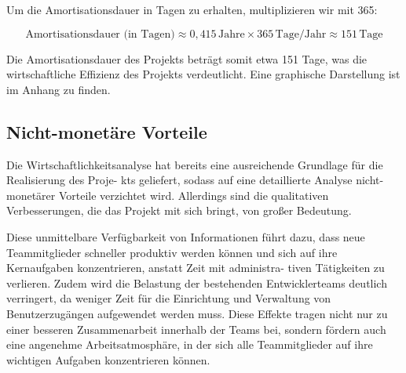 Um die Amortisationsdauer in Tagen zu erhalten, multiplizieren wir mit 365:

\[
\text{Amortisationsdauer (in Tagen)} \approx 0,415 \, \text{Jahre} \times 365 \, \text{Tage/Jahr} \approx 151 \, \text{Tage}
\]

Die Amortisationsdauer des Projekts beträgt somit etwa 151 Tage, was die wirtschaftliche Effizienz des Projekts verdeutlicht. Eine graphische Darstellung ist im Anhang  zu finden.

\subsection{Nicht-monetäre Vorteile}
\label{sec:Nutzwertanalyse}

Die Wirtschaftlichkeitsanalyse hat bereits eine ausreichende Grundlage für die Realisierung des Proje-
kts geliefert, sodass auf eine detaillierte Analyse nicht-monetärer Vorteile verzichtet wird. Allerdings sind die qualitativen Verbesserungen, die das Projekt mit sich bringt, von großer Bedeutung.

Diese unmittelbare Verfügbarkeit von Informationen führt dazu, dass neue Teammitglieder schneller produktiv werden können und sich auf ihre Kernaufgaben konzentrieren, anstatt Zeit mit administra-
tiven Tätigkeiten zu verlieren. Zudem wird die Belastung der bestehenden Entwicklerteams deutlich verringert, da weniger Zeit für die Einrichtung und Verwaltung von Benutzerzugängen aufgewendet werden muss. Diese Effekte tragen nicht nur zu einer besseren Zusammenarbeit innerhalb der Teams bei, sondern fördern auch eine angenehme Arbeitsatmosphäre, in der sich alle Teammitglieder auf ihre wichtigen Aufgaben konzentrieren können.
